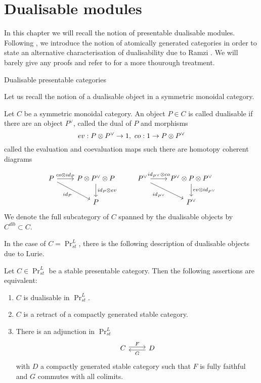 \section{Dualisable modules}\label{Dualisable modules}
In this chapter we will recall the notion of presentable dualisable modules. Following \Cite[Chapter 1]{ramzi2024dualizable}, we introduce the notion of atomically generated categories in order to state an alternative characterisation of dualisability due to Ramzi \Cite[Proposition 1.40]{ramzi2024dualizable}. We will barely give any proofs and refer to \Cite[Chapter 1]{ramzi2024dualizable} for a more thourough treatment.
\begin{subsection}{Dualisable presentable categories}

Let us recall the notion of a dualisable object in a symmetric monoidal category. 

\begin{definition}
Let $C$ be a symmetric monoidal category. An object $P\in C$ is called dualisable if there are an object $P^\vee$, called the dual of $P$ and morphisms 
\[
ev : P\otimes P^\vee \to 1  \space \space , \space  \ co :1 \to P\otimes P^\vee
\]
called the evaluation and coevaluation maps such there are homotopy coherent diagrams 

\[\begin{tikzcd}
	P & {P\otimes P^\vee \otimes P} & {P^\vee} & {P^\vee \otimes P \otimes P^\vee} \\
	& P && {P^\vee}
	\arrow["{co \otimes id_P}", from=1-1, to=1-2]
	\arrow["{id_P}"', from=1-1, to=2-2]
	\arrow["{id_P \otimes ev}", from=1-2, to=2-2]
	\arrow["{id_{P^\vee}\otimes co}", from=1-3, to=1-4]
	\arrow["{id_{P^\vee}}"', from=1-3, to=2-4]
	\arrow["{ev \otimes id_{P^\vee}}", from=1-4, to=2-4]
\end{tikzcd}\]
We denote the full subcategory of $C$ spanned by the dualisable objects by  $C^{dlb}\subset C$.
\end{definition}
In the case of $C= \Pr_{st}^L$, there is the following description of dualisable objects due to Lurie.

\begin{theorem}\Cite[Proposition D.7.3.1]{lurie2018spectral}\label{dlb in PrL}
    Let $C\in \Pr_{st}^L$ be a stable presentable category. Then the following assertions are equivalent:
    \begin{enumerate}
\item $C$ is dualisable in $\Pr_{st}^L$.
\item $C$ is a retract of a compactly generated stable category.
\item There is an adjunction in $\Pr_{st}^L$
\begin{equation*}
\begin{tikzcd}
C \arrow[r,shift left=.5ex,"F"]
&
D  \arrow[l,shift left=.5ex,"G"]
\end{tikzcd}
\end{equation*}
with $D$ a compactly generated stable category such that $F$ is fully faithful and $G$ commutes with all colimits.
    \end{enumerate}
\end{theorem}




\end{subsection}
